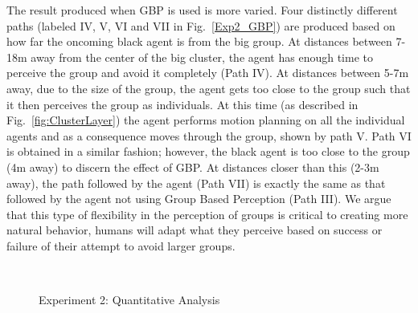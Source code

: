 The result produced when GBP is used is more varied. Four distinctly different paths (labeled IV, V, VI and VII in Fig.~\ref{Exp2_GBP}) are produced based on how far the oncoming black agent is from the big group. At distances between 7-18m away from the center of the big cluster, the agent has enough time to perceive the group and avoid it completely (Path IV). At distances between 5-7m away, due to the size of the group, the agent gets too close to the group such that it then perceives the group as individuals. At this time (as described in Fig.~\ref{fig:ClusterLayer}) the agent performs motion planning on all the individual agents and as a consequence moves through the group, shown by path V. Path VI is obtained in a similar fashion; however, the black agent is too close to the group (4m away) to discern the effect of GBP. At distances closer than this (2-3m away), the path followed by the agent (Path VII) is exactly the same as that followed by the agent not using Group Based Perception (Path III). We argue that this type of flexibility in the perception of groups is critical to creating more natural behavior, humans will adapt what they perceive based on success or failure of their attempt to avoid larger groups.

\begin{figure}[!t]
  \centering
  \hspace{1pt}
  \\
  \hspace{1pt}
  \caption{Experiment 2: Quantitative Analysis}
  \label{Exp2_QuantitativeAnalysis}
\end{figure}

